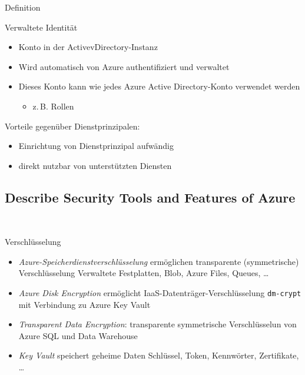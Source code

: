 \documentclass{scrartcl}
\newenvironment{flashcard}[2][]{%
    #1
    \vfill
    \centerline{\Large{#2}}
    \vfill
\newpage
}
{\newpage}
\newcommand{\subsectioncard}[1]{
    \vspace*{\stretch{1}}
    \subsection{#1}
    \vspace*{\stretch{1}}
    \pagebreak
}
\begin{document}
    \begin{flashcard}[Definition]{Verwaltete Identität}
            \begin{itemize}
                \item Konto in der ActivevDirectory-Instanz
                \item Wird automatisch von Azure authentifiziert und verwaltet
                \item Dieses Konto kann wie jedes Azure Active Directory-Konto verwendet werden
                    \begin{itemize}
                        \item z.\,B. Rollen
                    \end{itemize}
            \end{itemize}
            Vorteile gegenüber Dienstprinzipalen:
            \begin{itemize}
                \item Einrichtung von Dienstprinzipal aufwändig
                \item direkt nutzbar von unterstützten Diensten
            \end{itemize}
    \end{flashcard}

    \subsectioncard{Describe Security Tools and Features of Azure}

    \begin{flashcard}[\ ]{Verschlüsselung}
        \begin{itemize}
            \item \emph{Azure-Speicherdienstverschlüsselung} ermöglichen transparente (symmetrische) Verschlüsselung\newline
                Verwaltete Festplatten, Blob, Azure Files, Queues, \ldots
            \item \emph{Azure Disk Encryption} ermöglicht IaaS-Datenträger-Verschlüsselung\newline
                \texttt{dm-crypt} mit Verbindung zu Azure Key Vault
            \item \emph{Transparent Data Encryption}: transparente symmetrische Verschlüsselun von Azure SQL und Data Warehouse
            \item \emph{Key Vault} speichert geheime Daten\newline
                Schlüssel, Token, Kennwörter, Zertifikate, \ldots
        \end{itemize}
    \end{flashcard}
\end{document}
